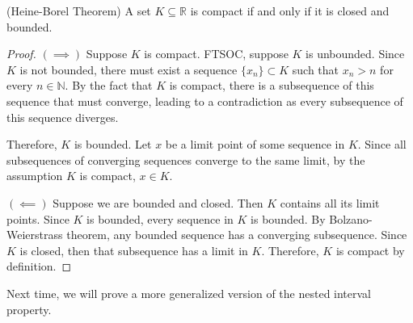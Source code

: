 \documentclass{ximera}
\begin{document}
\begin{theorem}{(Heine-Borel Theorem)}
    A set $K \subseteq \mathbb{R}$ is compact if and only if it is closed and bounded.
\end{theorem}
\begin{proof}
    $(\implies)$ Suppose $K$ is compact.  FTSOC, suppose $K$ is unbounded.  Since $K$ is not bounded, there must exist a sequence $\{x_n\}\subset K$ such that $x_n > n$ for every $n \in \mathbb{N}$.  By the fact that $K$ is compact, there is a subsequence of this sequence that must converge, leading to a contradiction as every subsequence of this sequence diverges.

    Therefore, $K$ is bounded.  Let $x$ be a limit point of some sequence in $K$.  Since all subsequences of converging sequences converge to the same limit, by the assumption $K$ is compact, $x \in K$.

    $(\impliedby)$
    Suppose we are bounded and closed.  Then $K$ contains all its limit points.  Since $K$ is bounded, every sequence in $K$ is bounded.  By Bolzano-Weierstrass theorem, any bounded sequence has a converging subsequence.  Since $K$ is closed, then that subsequence has a limit in $K$.  Therefore, $K$ is compact by definition.
\end{proof}


Next time, we will prove a more generalized version of the nested interval property.
    
\end{document}
